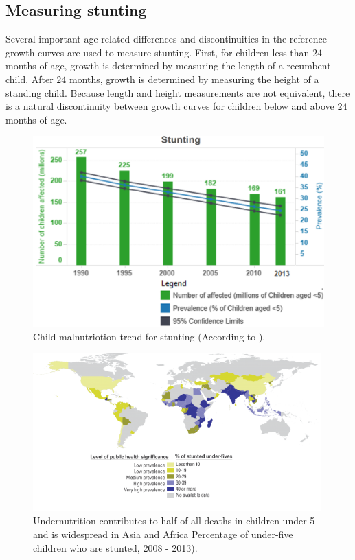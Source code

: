 \documentclass[10pt,twocolumn,letterpaper]{article}
\begin{document}
\subsection{Measuring stunting}

Several important age-related differences and discontinuities in the reference growth curves are used to measure stunting. First, for children less than $24$ months of age, growth is determined by measuring the length of a recumbent child. After $24$ months, growth is determined by measuring the height of a standing child. Because length and height measurements are not equivalent, there is a natural discontinuity between growth curves for children below and above $24$ months of age.

\begin{figure}
\begin{center}
	\includegraphics[width=0.99\columnwidth]{pics/unicef01}
	\caption{Child malnutriotion trend for stunting (According to \cite{Unicef}).\label{fig:unicef01}}   
\end{center} 
\end{figure}   

\begin{figure}
\begin{center}
	\includegraphics[width=0.99\textwidth]{pics/unicef02}
	\caption{Undernutrition contributes to half of all deaths in children under 5 and is widespread in Asia and Africa
Percentage of under-five children who are stunted, 2008 - 2013).\label{fig:unicef02}}   
\end{center} 
\end{figure}   
\end{document}
